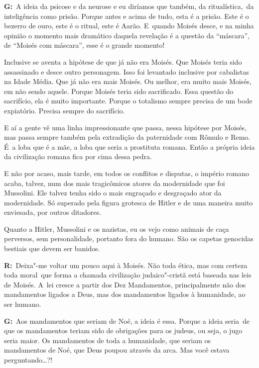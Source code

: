  

\textbf{G:}~A ideia da psicose e da neurose e eu diríamos que também, da
ritualística,\textbf{}~da inteligência como prisão. Porque antes e acima
de tudo, esta é a prisão. Este é o bezerro de ouro, este é o ritual,
este é Aarão. E~quando Moisés desce, e na minha opinião o momento mais
dramático daquela revelação é a questão da ``máscara'', de ``Moisés com
máscara'', esse é o grande momento!

 

Inclusive se aventa a hipótese de que já não era Moisés. Que Moisés
teria sido assassinado e desce outro personagem. Isso foi levantado
inclusive por cabalistas na Idade Média. Que já não era mais Moisés. Ou
melhor, era muito mais Moisés, em não sendo aquele. Porque Moisés teria
sido sacrificado. Essa questão do sacrifício, ela é muito importante.
Porque o totalismo sempre precisa de um bode expiatório. Precisa sempre
do sacrifício.

 

E aí a gente vê uma linha impressionante que passa, nessa hipótese por
Moisés, mas passa sempre também pela extradição da paternidade com
Rômulo e Remo. É~a loba que é a mãe, a loba que seria a prostituta
romana. Então a própria ideia da civilização romana fica por cima dessa
pedra.

 

E não por acaso, mais tarde, em todos os conflitos e disputas, o império
romano acaba, talvez, num dos mais tragicômicos atores da modernidade
que foi Mussolini. Ele talvez tenha sido o mais engraçado e desgraçado
ator da modernidade. Só superado pela figura grotesca de Hitler e de uma
maneira muito enviesada, por outros ditadores.

 

Quanto a Hitler, Mussolini e os nazistas, eu os vejo como animais de
caça perversos, sem personalidade, portanto fora do humano. São os
capetas genocidas bestiais que devem ser banidos.

 

\textbf{R:}~Deixa"-me voltar um pouco aqui à Moisés. Não toda ética, mas
com certeza toda moral\textbf{}~que forma a chamada civilização
judaico"-cristã está baseada nas leis de Moisés. A~lei cresce a partir
dos Dez Mandamentos, principalmente não dos mandamentos ligados a Deus,
mas dos mandamentos ligados à humanidade, ao ser humano.

 

\textbf{G:}~Aos mandamentos que seriam de Noé, a ideia é essa. Porque a
ideia seria\textbf{}~de que os mandamentos teriam sido de obrigações
para os judeus, ou seja, o jugo seria maior. Os mandamentos de toda a
humanidade, que seriam os mandamentos de Noé, que Deus poupou através da
arca. Mas você estava perguntando…?!

